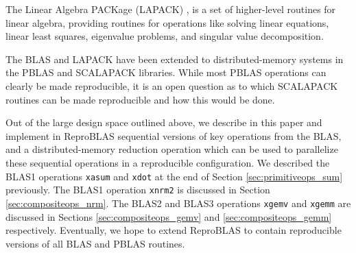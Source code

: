   The Linear Algebra PACKage (LAPACK) \cite{LAPACK}, is a set of higher-level
  routines for linear algebra, providing routines for operations like solving linear equations, linear least squares, eigenvalue problems, and singular value decomposition.

  The BLAS and LAPACK have been extended to distributed-memory systems in the PBLAS \cite{PBLAS} and SCALAPACK \cite{SCALAPACK} libraries. While most PBLAS operations can clearly be made reproducible, it is an open question as to which SCALAPACK routines can be made reproducible and how this would be done.

  Out of the large design space outlined above, we describe in this paper and implement in ReproBLAS sequential versions of key operations from the BLAS, and a distributed-memory reduction operation which can be used to parallelize these sequential operations in a reproducible configuration. We described the BLAS1 operations \texttt{xasum} and \texttt{xdot} at the end of Section \ref{sec:primitiveops_sum} previously. The BLAS1 operation \texttt{xnrm2} is discussed in Section \ref{sec:compositeops_nrm}. The BLAS2 and BLAS3 operations \texttt{xgemv} and \texttt{xgemm} are discussed in Sections \ref{sec:compositeops_gemv} and \ref{sec:compositeops_gemm} respectively. Eventually, we hope to extend ReproBLAS to contain reproducible versions of all BLAS and PBLAS routines.

    
    
    
    
